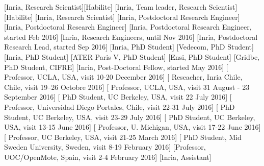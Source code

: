\documentclass{ra2016}
\begin{document}
\begin{composition}
    [Inria, Research Scientist][Habilite]
    [Inria, Team leader, Research Scientist][Habilite]
    [Inria, Research Scientist]
    [Inria, Postdoctoral Research Engineer]
    [Inria, Postdoctoral Research Engineer]
    [Inria, Postdoctoral Research Engineer, started Feb 2016]
    [Inria, Research Engineers, until Nov 2016]
    [Inria, Postdoctoral Research Lead, started Sep 2016]
    [Inria, PhD Student]
    [Vedecom, PhD Student]
    [Inria, PhD Student]
    [ATER Paris V, PhD Student]
    [Ensi, PhD Student]
    [Gridbe, PhD Student, CIFRE]
    [Inria, Post-Doctoral Fellow, started May 2016]
    [    Professor,   UCLA,                       USA,    visit 10-20 December 2016]
    [ Reseacher,   Inria Chile,                Chile,  visit 19–26 Octobre 2016]
    [    Professor,   UCLA,                       USA,    visit 31 August - 23 September 2016]
    [  PhD Student, UC Berkeley,                USA,    visit 22 July 2016]
    [  Professor,   Universidad Diego Portales, Chile,  visit 22-31 July 2016]
    [   PhD Student, UC Berkeley,                USA,    visit 23-29 July 2016]
    [  PhD Student, UC Berkeley,                USA,    visit 13-15 June 2016]
    [  Professor,   U. Michigan,                USA,    visit 17-22 June 2016]
    [  Professor,   UC Berkeley,                USA,    visit 21-25 March 2016]
    [    PhD Student, Mid Sweden University,      Sweden, visit 8-19 February 2016]
    [Professor,   UOC/OpenMote,               Spain,  visit 2-4 February 2016]
    [Inria, Assistant]

\end{composition}
\end{document}
